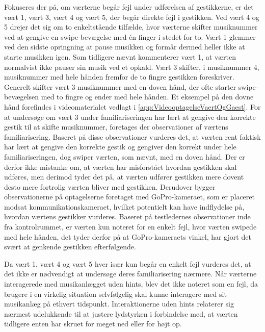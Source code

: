 Fokuseres der på, om værterne begår fejl under udførelsen af gestikkerne, er det vært 1, vært 3, vært 4 og vært 5, der begår direkte fejl i gestikken. Ved vært 4 og 5 drejer det sig om to enkeltstående tilfælde, hvor værterne skifter musiknummer ved at gengive en swipe-bevægelse med én finger i stedet for to. Vært 1 glemmer ved den sidste opringning at pause musikken og formår dermed heller ikke at starte musikken igen. Som tidligere nævnt kommenterer vært 1, at værten normalvist ikke pauser sin musik ved et opkald. Vært 3 skifter, i musiknummer 4, musiknummer med hele hånden fremfor de to fingre gestikken foreskriver. Generelt skifter vært 3 musiknummer med en doven hånd, der ofte starter swipe-bevægelsen med to fingre og ender med hele hånden. Et eksempel på den dovne hånd forefindes i videomaterialet vedlagt i \autoref{app:VideooptagelseVaertOgGaest}. For at undersøge om vært 3 under familiariseringen har lært at gengive den korrekte gestik til at skifte musiknummer, foretages der observationer af værtens familiarisering. Baseret på disse observationer vurderes det, at værten rent faktisk har lært at gengive den korrekte gestik og gengiver den korrekt under hele familiariseringen, dog swiper værten, som nævnt, med en doven hånd. Der er derfor ikke mistanke om, at værten har misforstået hvordan gestikken skal udføres, men derimod tyder det på, at værten udfører gestikken mere dovent desto mere fortrolig værten bliver med gestikken. Derudover bygger observationerne på optagelserne foretaget med GoPro-kameraet, som er placeret modsat kommunikationskameraet, hvilket potentielt kan have indflydelse på, hvordan værtens gestikker vurderes. Baseret på testledernes observationer inde fra kontrolrummet, er værten kun noteret for en enkelt fejl, hvor værten swipede med hele hånden, det tyder derfor på at GoPro-kameraets vinkel, har gjort det svært at genkende gestikken efterfølgende. 

Da vært 1, vært 4 og vært 5 hver især kun begår en enkelt fejl vurderes det, at det ikke er nødvendigt at undersøge deres familiarisering nærmere.\blankline
%
Når værterne interagerede med musikanlægget uden hints, blev det ikke noteret som en fejl, da brugere i en virkelig situation selvfølgelig skal kunne interagere med sit musikanlæg på ethvert tidspunkt. Interaktionerne uden hints relaterer sig nærmest udelukkende til at justere lydstyrken i forbindelse med, at værten tidligere enten har skruet for meget ned eller for højt op. 

